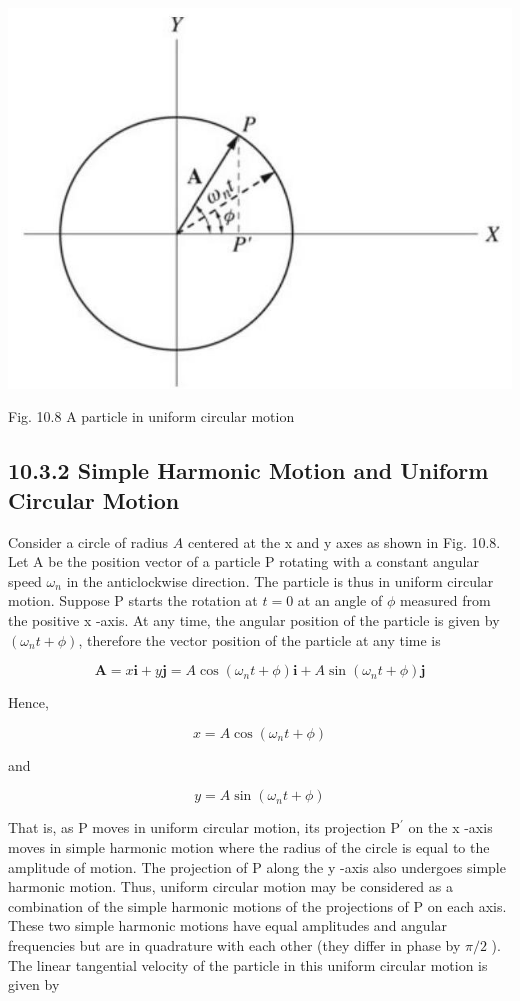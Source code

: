 \documentclass[10pt]{article}
\begin{document}
\begin{center}
\includegraphics[max width=\textwidth]{2024_09_13_db1f357d2aad0a03eb2eg-166(1)}
\end{center}

Fig. 10.8 A particle in uniform circular motion

\subsection*{10.3.2 Simple Harmonic Motion and Uniform Circular Motion}
Consider a circle of radius $A$ centered at the x and y axes as shown in Fig. 10.8. Let A be the position vector of a particle P rotating with a constant angular speed $\omega_{n}$ in the anticlockwise direction. The particle is thus in uniform circular motion. Suppose P starts the rotation at $t=0$ at an angle of $\phi$ measured from the positive x -axis. At any time, the angular position of the particle is given by $\left(\omega_{n} t+\phi\right)$, therefore the vector position of the particle at any time is

$$
\mathbf{A}=x \mathbf{i}+y \mathbf{j}=A \cos \left(\omega_{n} t+\phi\right) \mathbf{i}+A \sin \left(\omega_{n} t+\phi\right) \mathbf{j}
$$

Hence,

$$
x=A \cos \left(\omega_{n} t+\phi\right)
$$

and

$$
y=A \sin \left(\omega_{n} t+\phi\right)
$$

That is, as P moves in uniform circular motion, its projection $\mathrm{P}^{\prime}$ on the x -axis moves in simple harmonic motion where the radius of the circle is equal to the amplitude of motion. The projection of P along the y -axis also undergoes simple harmonic motion. Thus, uniform circular motion may be considered as a combination of the simple harmonic motions of the projections of P on each axis. These two simple harmonic motions have equal amplitudes and angular frequencies but are in quadrature with each other (they differ in phase by $\pi / 2$ ). The linear tangential velocity of the particle in this uniform circular motion is given by
\end{document}
